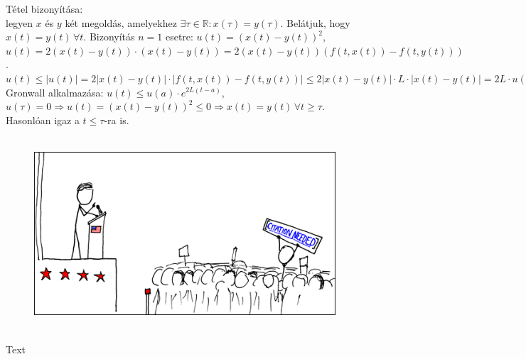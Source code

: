 \documentclass[12pt,a4paper]{scrartcl}
\newenvironment{bizonyitas}{}{}
\newenvironment{ajanlofig}{\begin{figure}\begin{center}}{
\end{center}\end{figure}}
\begin{document}
\begin{bizonyitas}

Tétel bizonyítása:\\
legyen \(x\) és \(y\) két megoldás, amelyekhez
\(\exists\tau \in {\mathbb{R}}:x\left( \tau \right) = y\left( \tau \right)\).
Belátjuk, hogy \(x\left( t \right) = y\left( t \right)\,\forall t\).
Bizonyítás \(n = 1\) esetre:
\(u\left( t \right) = \left( {x\left( t \right) - y\left( t \right)} \right)^{2}\),
\(\overset{}{u}\left( t \right) = 2\left( {x\left( t \right) - y\left( t \right)} \right) \cdot \left( {\overset{}{x}\left( t \right) - \overset{}{y}\left( t \right)} \right) = 2\left( {x\left( t \right) - y\left( t \right)} \right)\left( {f\left( {t,x\left( t \right)} \right) - f\left( {t,y\left( t \right)} \right)} \right)\).
\(\overset{}{u}\left( t \right) \leq \left| {\overset{}{u}\left( t \right)} \right| = 2\left| {x\left( t \right) - y\left( t \right)} \right| \cdot \left| {f\left( {t,x\left( t \right)} \right) - f\left( {t,y\left( t \right)} \right)} \right| \leq 2\left| {x\left( t \right) - y\left( t \right)} \right| \cdot L \cdot \left| {x\left( t \right) - y\left( t \right)} \right| = 2L \cdot u\left( t \right)\)
Gronwall alkalmazása:
\(u\left( t \right) \leq u\left( a \right) \cdot e^{2L{({t - a})}}\),
\(\left. u\left( \tau \right) = 0\Rightarrow u\left( t \right) = \left( {x\left( t \right) - y\left( t \right)} \right)^{2} \leq 0\Rightarrow x\left( t \right) = y\left( t \right)\,\forall t \geq \tau \right.\).
Hasonlóan igaz a \(t \leq \tau\)-ra is.

\end{bizonyitas}

\begin{ajanlo}

\begin{ajanlofig}

\href{https://xkcd.com}{\includegraphics[width=5.20833in,height=2.82292in]{wikipedian_protester.png}}

\end{ajanlofig}

Text

\end{ajanlo}
\end{document}
